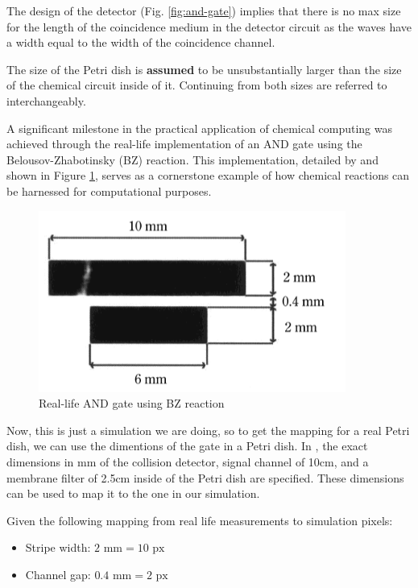 The design of the detector (Fig. \ref{fig:and-gate}) implies that there is no max size for the length of the coincidence medium in the detector circuit as the waves have a width equal to the width of the coincidence channel.
\begin{tcolorbox}[colback=red!5!white,colframe=red!75!black,title=Assumption]
    The size of the Petri dish is \textbf{assumed} to be unsubstantially larger than the size of the chemical circuit inside of it. Continuing from both sizes are referred to interchangeably.
\end{tcolorbox}
A significant milestone in the practical application of chemical computing was achieved through the real-life implementation of an AND gate using the Belousov-Zhabotinsky (BZ) reaction. This implementation, detailed by \cite{gorecki2003chemical} and shown in Figure \ref{fig:bz-and-gate}, serves as a cornerstone example of how chemical reactions can be harnessed for computational purposes.

\begin{figure}
    \centering
    \includegraphics[width=0.6\linewidth]{images/Screenshot 2024-03-10 at 20.59.51.png}
    \caption{Real-life AND gate using BZ reaction \citep{gorecki2003chemical}}
    \label{fig:bz-and-gate}
\end{figure}


Now, this is just a simulation we are doing, so to get the mapping for a real Petri dish, we can use the dimentions of the gate in a Petri dish. 
In \cite{gorecki2003chemical}, the exact dimensions in mm of the collision detector, signal channel of 10cm, and a membrane filter of 2.5cm inside of the Petri dish are specified. These dimensions can be used to map it to the one in our simulation.


Given the following mapping from real life measurements to simulation pixels:
\begin{itemize}
    \item Stripe width: \(2 \text{ mm} = 10 \text{ px}\)
    \item Channel gap: \(0.4 \text{ mm} = 2 \text{ px}\)
\end{itemize}

